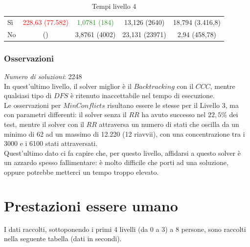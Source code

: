  \begin{table}[h] 
	\begin{tabular}{|l||*{4}{c|}}\hline 
		\backslashbox{Miglioria}{Solver} 
		&\makebox{DFS}&\makebox{Backtracking}&\makebox{Recursive Backtracking}	&\makebox{MinConflicts}\\ \hline 
		Sì&\textcolor{red}{228,63 (77.582)}&\textcolor{ForestGreen}{1,0781 (184)}&13,126 (2640)&18,794 (3.416,8) \\ \hline 
		No& ()&3,8761 (4002)&23,131 (23971)&2,94 (458,78)  \\ \hline 
	\end{tabular} 
	\caption{Tempi livello 4}
\end{table}

\subsubsection{Osservazioni}

\textit{Numero di soluzioni}: 2248\\

In quest'ultimo livello, il solver miglior è il $Backtracking$ con il $CCC$, mentre qualsiasi tipo di $DFS$ è ritenuto inaccettabile nel tempo di esecuzione.\\

Le osservazioni per $MinConflicts$ risultano essere le stesse per il Livello 3, ma con parametri differenti: il solver senza il $RR$ ha avuto successo nel $22,5\%$ dei test, mentre il solver con il $RR$ attraversa un numero di stati che oscilla da un minimo di 62 ad un massimo di 12.220 (12 riavvii), con una concentrazione tra i 3000 e i 6100 stati attraversati.\\

Quest'ultimo dato ci fa capire che, per questo livello, affidarsi a questo solver è un azzardo spesso fallimentare: è molto difficile che porti ad una soluzione, oppure potrebbe metterci un tempo troppo elevato. 

\section{Prestazioni essere umano}
\label{human}
I dati raccolti, sottoponendo i primi 4 livelli (da 0 a 3) a 8 persone, sono raccolti nella seguente tabella (dati in secondi).


